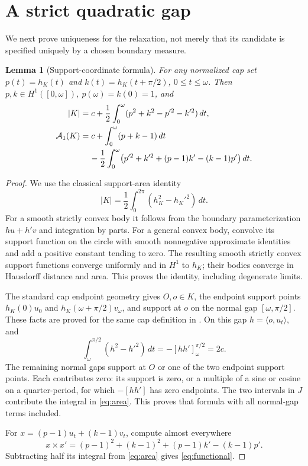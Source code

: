 \documentclass[11pt]{article}
\newtheorem{lemma}[theorem]{Lemma}
\theoremstyle{remark}\newtheorem{remark}[theorem]{Remark}
\newcommand{\area}[1]{\lvert #1\rvert}
\newcommand{\ip}[2]{\langle #1,#2\rangle}
\newcommand{\Aone}{\mathcal A_1}
\begin{document}
\section{A strict quadratic gap}
We next prove uniqueness for the relaxation, not merely that its candidate is specified uniquely by a chosen boundary measure.

\begin{lemma}[Support-coordinate formula]\label{lem:functional}
For any normalized cap set $p(t)=h_K(t)$ and $k(t)=h_K(t+\pi/2)$, $0\le t\le\omega$. Then $p,k\in H^1([0,\omega])$, $p(\omega)=k(0)=1$, and
\begin{align}
 \area K&=c+\frac12\int_0^\omega(p^2+k^2-p'^2-k'^2)\,dt,\label{eq:area}\\
 \Aone(K)&=c+\int_0^\omega(p+k-1)\,dt\notag\\
 &\hspace{4mm}-\frac12\int_0^\omega\bigl(p'^2+k'^2+(p-1)k'-(k-1)p'\bigr)\,dt.\label{eq:functional}
\end{align}
\end{lemma}
\begin{proof}
We use the classical support-area identity
\[
 \area K=\frac12\int_0^{2\pi}(h_K^2-h_K'^2)\,dt.
\]
For a smooth strictly convex body it follows from the boundary parameterization $h u+h'v$ and integration by parts. For a general convex body, convolve its support function on the circle with smooth nonnegative approximate identities and add a positive constant tending to zero. The resulting smooth strictly convex support functions converge uniformly and in $H^1$ to $h_K$; their bodies converge in Hausdorff distance and area. This proves the identity, including degenerate limits.

The standard cap endpoint geometry gives $O,o\in K$, the endpoint support points $h_K(0)u_0$ and $h_K(\omega+\pi/2)v_\omega$, and support at $o$ on the normal gap $[\omega,\pi/2]$. These facts are proved for the same cap definition in \cite[Section 2, lemmas on cap vertices and boundary ends]{Companion}. On this gap $h=\ip o{u_t}$, and
\[
 \int_\omega^{\pi/2}(h^2-h'^2)\,dt=-[hh']_\omega^{\pi/2}=2c.
\]
The remaining normal gaps support at $O$ or one of the two endpoint support points. Each contributes zero: its support is zero, or a multiple of a sine or cosine on a quarter-period, for which $-[hh']$ has zero endpoints. The two intervals in $J$ contribute the integral in \eqref{eq:area}. This proves that formula with all normal-gap terms included.

For $x=(p-1)u_t+(k-1)v_t$, compute almost everywhere
\[
 x\times x'=(p-1)^2+(k-1)^2+(p-1)k'-(k-1)p'.
\]
Subtracting half its integral from \eqref{eq:area} gives \eqref{eq:functional}.
\end{proof}
\end{document}
